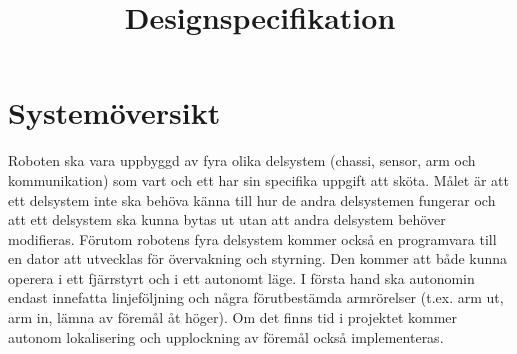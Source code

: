 \documentclass[a4paper,12pt]{article}
\title{Designspecifikation}
\renewcommand{\thepage}{\roman{page}}
\begin{document}
\LIPStitelsida

\begin{LIPSprojektidentitet}
\end{LIPSprojektidentitet}


\renewcommand*\contentsname{Innehåll}
\begin{spacing}{0.5}
\tableofcontents{}
\end{spacing}
\newpage

\begin{LIPSdokumenthistorik}
\end{LIPSdokumenthistorik}
\newpage

\renewcommand{\thepage}{\arabic{page}}
\setcounter{page}{1}

\section{Systemöversikt}

Roboten ska vara uppbyggd av fyra olika delsystem (chassi, sensor, arm och kommunikation) som vart och ett har sin specifika uppgift att sköta. Målet är att ett delsystem inte ska behöva känna till hur de andra delsystemen fungerar och att ett delsystem ska kunna bytas ut utan att andra delsystem behöver modifieras. Förutom robotens fyra delsystem kommer också en programvara till en dator att utvecklas för övervakning och styrning. Den kommer att både kunna operera i ett fjärrstyrt och i ett autonomt läge. I första hand ska autonomin endast innefatta linjeföljning och några förutbestämda armrörelser (t.ex. arm ut, arm in, lämna av föremål åt höger). Om det finns tid i projektet kommer autonom lokalisering och upplockning av föremål också implementeras.
\end{document}
